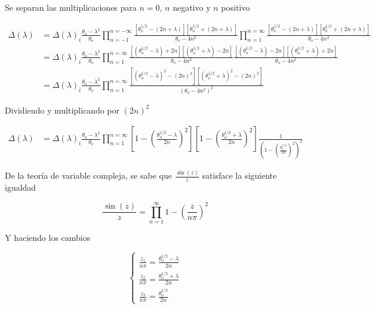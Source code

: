Se separan las multiplicaciones para $n=0$, $n$ negativo y $n$ positivo

\begin{equation}\label{eq:E.19}
    \begin{aligned}
    \Delta(\lambda) &=\Delta(\lambda)_{i} \frac{\theta_o-\lambda^2}{\theta_o}\prod_{n=-1}^{n=-\infty} \frac{[\theta_o^{1/2}-(2n+\lambda)][\theta_o^{1/2}+(2n+\lambda)]}{\theta_o-4n^2}\prod_{n=1}^{n=\infty} \frac{[\theta_o^{1/2}-(2n+\lambda)][\theta_o^{1/2}+(2n+\lambda)]}{\theta_o-4n^2}\\
    &=\Delta(\lambda)_{i} \frac{\theta_o-\lambda^2}{\theta_o}\prod_{n=1}^{n=\infty} \frac{[(\theta_o^{1/2}-\lambda)+2n][(\theta_o^{1/2}+\lambda)-2n]}{\theta_o-4n^2} \frac{[(\theta_o^{1/2}-\lambda)-2n][(\theta_o^{1/2}+\lambda)+2n]}{\theta_o-4n^2}\\
    &=\Delta(\lambda)_{i} \frac{\theta_o-\lambda^2}{\theta_o}\prod_{n=1}^{n=\infty} \frac{[(\theta_o^{1/2}-\lambda)^2-(2n)^2][(\theta_o^{1/2}+\lambda)^2-(2n)^2]}{(\theta_o-4n^2)^2}
    \end{aligned}
\end{equation}


Dividiendo y multiplicando por $(2n)^2$

\begin{equation}\label{eq:E.20}
\begin{aligned}
\Delta(\lambda) & =\Delta(\lambda)_{i} \frac{\theta_o-\lambda^2}{\theta_o}\prod_{n=1}^{n=\infty} [1-(\frac{\theta_o^{1/2}-\lambda}{2n})^2][1-(\frac{\theta_o^{1/2}+\lambda}{2n})^2]\frac{1}{(1-(\frac{\theta_o^{1/2}}{2n})^2)^2}
\end{aligned}
\end{equation}

De la teoría de variable compleja, se sabe que $\frac{\sin(z)}{z}$  satisface la siguiente igualdad \cite{Philip}

\large
\begin{equation}\label{eq:E.21}
\frac{\sin(z)}{z} = \prod_{n=1}^{\infty} 1-(\frac{z}{n \pi})^2
\end{equation}
\normalsize

Y haciendo los cambios

\Large
\begin{equation}\label{eq:E.22}
\begin{cases}
\frac{z_1}{n\pi}=\frac{\theta_o^{1/2}-\lambda}{2n}\\
\frac{z_2}{n\pi}=\frac{\theta_o^{1/2}+\lambda}{2n}\\
\frac{z_3}{n\pi}= \frac{\theta_o^{1/2}}{2n}
\end{cases}
\end{equation}
\normalsize

